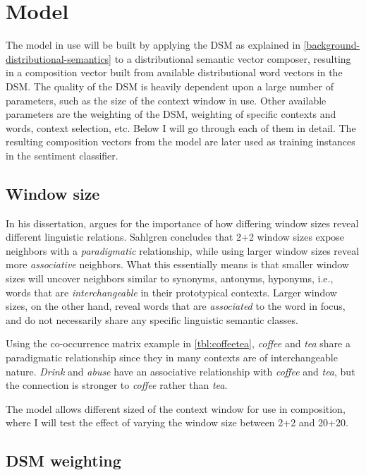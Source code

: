 \chapter{Model}
\label{model}

The model in use will be built by applying the DSM as explained in \cref{background-distributional-semantics} to a distributional semantic vector composer, resulting in a composition vector built from available distributional word vectors in the DSM. The quality of the DSM is heavily dependent upon a large number of parameters, such as the size of the context window in use. Other available parameters are the weighting of the DSM, weighting of specific contexts and words, context selection, etc. Below I will go through each of them in detail. The resulting composition vectors from the model are later used as training instances in the sentiment classifier.

\section{Window size}\label{background-window-sizes}

In his dissertation, \textcite[pp. 119-125]{Sahlgren2006WordSpace} argues for the importance of how differing window sizes reveal different linguistic relations. Sahlgren concludes that 2+2 window sizes expose neighbors with a \emph{paradigmatic} relationship, while using larger window sizes reveal more \emph{associative} neighbors. What this essentially means is that smaller window sizes will uncover neighbors similar to synonyms, antonyms, hyponyms, i.e., words that are \emph{interchangeable} in their prototypical contexts.  Larger window sizes, on the other hand, reveal words that are \emph{associated} to the word in focus, and do not necessarily share any specific linguistic semantic classes.

Using the co-occurrence matrix example in \cref{tbl:coffeetea}, \emph{coffee} and \emph{tea} share a paradigmatic relationship since they in many contexts are of interchangeable nature. \emph{Drink} and \emph{abuse} have an associative relationship with \emph{coffee} and \emph{tea}, but the connection is stronger to \emph{coffee} rather than \emph{tea}.

The model allows different sized of the context window for use in composition, where I will test the effect of varying the window size between 2+2 and 20+20.

\section{DSM weighting}\label{background-dsm-weighting}

